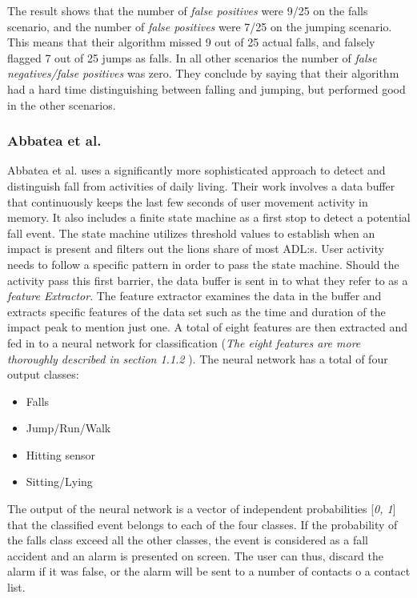 \documentclass[12pt, a4paper, onecolumn]{article}
\begin{document}
	The result shows that the number of \textit{false positives} were 9/25 on the falls scenario, and the number of \textit{false positives} were 7/25 on the jumping scenario. This means that their algorithm missed 9 out of 25 actual falls, and falsely flagged 7 out of 25 jumps as falls. In all other scenarios the number of \textit{false negatives/false positives} was zero. They conclude by saying that their algorithm had a hard time distinguishing between falling and jumping, but performed good in the other scenarios. 
	
	
	\subsubsection{Abbatea et al.}
	Abbatea et al. uses a significantly more sophisticated approach to detect and distinguish fall from activities of daily living. Their work involves a data buffer that continuously keeps the last few seconds of user movement activity in memory. It also includes a finite state machine as a first stop to detect a potential fall event. The state machine utilizes threshold values to establish when an impact is present and filters out the lions share of most ADL:s. User activity needs to follow a specific pattern in order to pass the state machine. Should the activity pass this first barrier, the data buffer is sent in to what they refer to as a \textit{feature Extractor}. The feature extractor examines the data in the buffer and extracts specific features of the data set such as the time and duration of the impact peak to mention just one. A total of eight features are then extracted and fed in to a neural network for classification  (\textit{The eight features are more thoroughly described in section 1.1.2 }). The neural network has a total of four output classes:

	\begin{itemize}
		\item Falls
		\item Jump/Run/Walk
		\item Hitting sensor
		\item Sitting/Lying
	\end{itemize}

	The output of the neural network is a vector of independent probabilities [\textit{0, 1}] that the classified event belongs to each of the four classes. If the probability of the falls class exceed all the other classes, the event is considered as a fall accident and an alarm is presented on screen. The user can thus, discard the alarm if it was false, or the alarm will be sent to a number of contacts o a contact list. 
\end{document}
